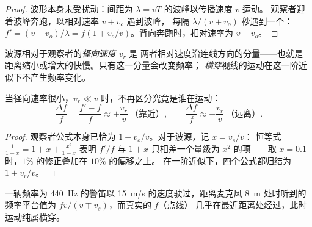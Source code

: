 \begin{proof}
波形本身未受扰动：间距为 $\lambda = vT$ 的波峰以传播速度 $v$ 运动。
观察者迎着波峰奔跑，以相对速率 $v + v_o$ 遇到波峰，
每隔 $\lambda/(v + v_o)$ 秒遇到一个：$f' = (v + v_o)/\lambda = f(1 + v_o/v)$。背向奔跑时，相对速率为 $v - v_o$。
\end{proof}

\begin{definition}[径向速度]\label{def:g12:doppler-effect:radial}
波源相对于观察者的\emph{径向速度} $v_r$ 是
两者相对速度沿连线方向的分量——也就是
距离缩小或增大的快慢。只有这一分量会改变频率；
\emph{横穿}视线的运动在这一阶近似下不产生频率变化。
\end{definition}

\begin{proposition}\label{prop:g12:doppler-effect:slow}
当径向速率很小，$v_r \ll v$ 时，不再区分究竟是谁在运动：
\[
\frac{\Delta f}{f} = \frac{f' - f}{f} \approx +\frac{v_r}{v} \ \text{（靠近）},
\qquad
\frac{\Delta f}{f} \approx -\frac{v_r}{v} \ \text{（远离）}.
\]
\end{proposition}

\begin{proof}
观察者公式本身已恰为 $1 \pm v_o/v$。对于波源，记 $x = v_s/v$：
恒等式 $\frac{1}{1 - x} = 1 + x + \frac{x^2}{1 - x}$ 表明 $f'/f$ 与
$1 + x$ 只相差一个量级为 $x^2$ 的项——取 $x = 0.1$ 时，$1\%$ 的修正叠加在 $10\%$ 的偏移之上。
在一阶近似下，四个公式都归结为 $1 \pm v_r/v$。
\end{proof}

\begin{omfigure}

{\small 一辆频率为 \qty{440}{Hz} 的警笛以 \qty{15}{m/s} 的速度驶过，距离麦克风 \qty{8}{m}
处时听到的频率平台值为 $fv/(v \mp v_s)$，而真实的 $f$（点线）
几乎在最近距离处经过，此时运动纯属横穿。}
\end{omfigure}


